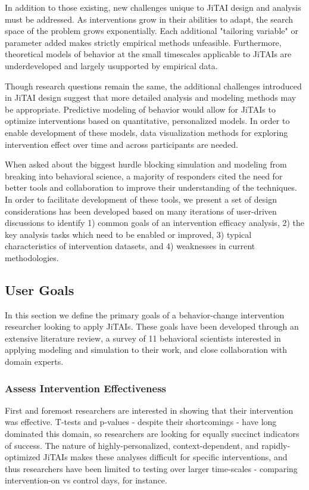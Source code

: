\documentclass[review,journal]{vgtc}         %
\begin{document}
In addition to those existing, new challenges unique to JiTAI design and analysis must be addressed.
As interventions grow in their abilities to adapt, the search space of the problem grows exponentially.
Each additional "tailoring variable" or parameter added makes strictly empirical methods unfeasible.
Furthermore, theoretical models of behavior at the small timescales applicable to JiTAIs are underdeveloped and largely usupported by empirical data. 

Though research questions remain the same, the additional challenges introduced in JiTAI design suggest that more detailed analysis and modeling methods may be appropriate.
Predictive modeling of behavior would allow for JiTAIs to optimize interventions based on quantitative, personalized models.
In order to enable development of these models, data visualization methods for exploring intervention effect over time and across participants are needed. 

When asked about the biggest hurdle blocking simulation and modeling from breaking into behavioral science, a majority of responders cited the need for better tools and collaboration to improve their understanding of the techniques.
In order to facilitate development of these tools, we present a set of design considerations has been developed based on many iterations of user-driven discussions to identify 1) common goals of an intervention efficacy analysis, 2) the key analysis tasks which need to be enabled or improved, 3) typical characteristics of intervention datasets, and 4) weaknesses in current methodologies. 

\subsection{User Goals}
In this section we define the primary goals of a behavior-change intervention researcher looking to apply JiTAIs.
These goals have been developed through an extensive literature review, a survey of 11 behavioral scientists interested in applying modeling and simulation to their work, and close collaboration with domain experts.

\subsubsection{Assess Intervention Effectiveness}
First and foremost researchers are interested in showing that their intervention was effective.
T-tests and p-values - despite their shortcomings \cite{nuzzo2014} - have long dominated this domain, so researchers are looking for equally succinct indicators of success.
The nature of highly-personalized, context-dependent, and rapidly-optimized JiTAIs makes these analyses difficult for specific interventions, and thus researchers have been limited to testing over larger time-scales - comparing intervention-on vs control days, for instance.
\end{document}
